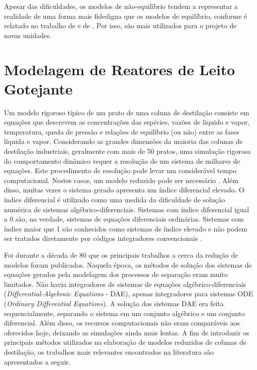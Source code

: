 Apesar das dificuldades, os modelos de não-equilíbrio tendem a representar a realidade de uma forma mais fidedigna que os
modelos de equilíbrio, conforme é relatado no trabalho de  e de . Por isso,
são mais utilizados para o projeto de novas unidades.

\section{Modelagem de Reatores de Leito Gotejante} \label{sec:modred}
Um modelo rigoroso típico de um prato de uma coluna de destilação consiste em equações que descrevem as
concentrações das espécies, vazões de líquido e vapor, temperatura, queda de pressão e relações de
equilíbrio (ou não) entre as
fases líquida e vapor. Considerando as grandes dimensões da maioria das colunas de destilação industriais, geralmente
com mais de 50 pratos, uma simulação rigorosa do comportamento dinâmico requer a resolução de um sistema de milhares
de equações. Este procedimento de resolução pode levar um considerável tempo computacional. Nestes casos, um modelo
reduzido pode ser necessário \cite{Musch:1993}. Além disso, muitas vezes o sistema
gerado apresenta um índice diferencial elevado. O índice diferencial é utilizado como uma medida da dificuldade de
solução numérica de sistemas algébrico-diferenciais. Sistemas com índice diferencial igual a 0 são, na verdade,
sistemas de equações diferenciais ordinárias. Sistemas com índice maior que 1 são conhecidos como sistemas de índice
elevado e não podem ser tratados diretamente por códigos integradores convencionais \cite{Brennan:1989}.

Foi durante a década de 80 que os principais trabalhos a cerca da redução de modelos foram publicados. Naquela época, os
métodos de solução dos sistemas de equações gerados pela modelagem dos processos de separação eram muito limitados. Não
havia integradores de sistemas de equações algébrico-diferenciais (\emph{Differential-Algebraic Equations} - DAE), apenas
integradores para sistemas ODE (\emph{Ordinary Differential Equations}). A solução dos sistemas DAE era feita
sequencialmente, separando o sistema em um conjunto algébrico e um conjunto diferencial. Além disso, os recursos
computacionais não eram comparáveis aos oferecidos hoje, deixando as simulações ainda mais lentas.
A fim de introduzir os principais métodos utilizados na elaboração de modelos reduzidos de colunas de destilação, os
trabalhos mais relevantes encontrados na literatura são apresentados a seguir.

